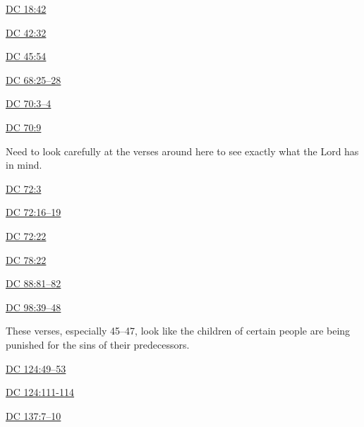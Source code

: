 		\begin{compactdesc}
			\item[{\hyperref[DC18-42]{DC 18:42}}]
			\item[{\hyperref[DC42-32]{DC 42:32}}]
			\item[{\hyperref[DC45-54]{DC 45:54}}]
			\item[{\hyperref[DC68-25]{DC 68:25--28}}]
			\item[{\hyperref[DC70-3]{DC 70:3--4}}] 
			\item[{\hyperref[DC70-9]{DC 70:9}}] \phantom{.}
				\begin{compactitem}
					\item Need to look carefully at the verses around here to see exactly what the Lord has in mind.
				\end{compactitem}
			\item[{\hyperref[DC72-3]{DC 72:3}}]
			\item[{\hyperref[DC72-16]{DC 72:16--19}}]
			\item[{\hyperref[DC72-22]{DC 72:22}}]
			\item[{\hyperref[DC78-22]{DC 78:22}}]
			\item[{\hyperref[DC88-81]{DC 88:81--82}}]
			\item[{\hyperref[DC98-39]{DC 98:39--48}}] \phantom{.}
				\begin{compactitem}
					\item These verses, especially 45--47, look like the children of certain people are being punished for the sins of their predecessors.
				\end{compactitem}
			\item[{\hyperref[DC124-49]{DC 124:49--53}}]
			\item[{\hyperref[DC124-111]{DC 124:111-114}}]
			\item[{\hyperref[DC137-7]{DC 137:7--10}}]
		\end{compactdesc}
		
	
		
		

